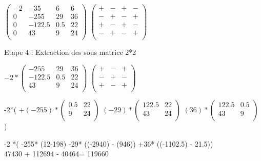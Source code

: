 $
\begin{pmatrix}
 -2 & -35    & 6     & 6 \\
  0 & -255   & 29    & 36 \\
  0 & -122.5 & 0.5 & 22 \\
  0 & 43     & 9    & 24 \\
\end{pmatrix}
$
$
\begin{pmatrix}
 + & - & + & - \\
 - & + & - & + \\
 + & - & + & - \\
 - & + & - & + \\
\end{pmatrix}
$

\vspace{5mm} %
Etape 4 : Extraction des sous matrice 2*2
\vspace{5mm} %

$
-2*
\begin{pmatrix}
  -255   & 29   & 36 \\
  -122.5 & 0.5  & 22 \\
  43     & 9    & 24 \\
\end{pmatrix}
$
\vspace{5mm} %
$
\begin{pmatrix}
  + & - & + \\
  - & + & - \\
  + & - & + \\
\end{pmatrix}
$


-2*(
$
+(-255)*
\begin{pmatrix}
  0.5 & 22 \\
  9   & 24 \\
\end{pmatrix}
$
$
(-29)*
\begin{pmatrix}
  122.5 & 22 \\
  43   & 24 \\
\end{pmatrix}
$
$
(36)*
\begin{pmatrix}
  122.5 & 0.5 \\
  43   & 9 \\
\end{pmatrix}
$
)

\vspace{5mm}

-2 *( -255* (12-198) -29* ((-2940) - (946)) +36* ((-1102.5) - 21.5)) \\
47430 + 112694 - 40464= 119660

